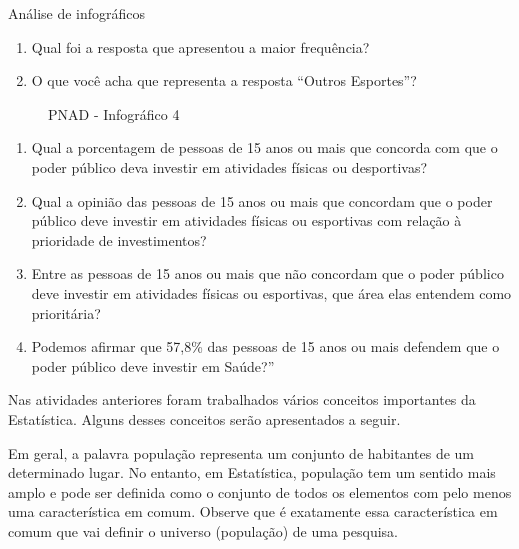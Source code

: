 \begin{task}{ Análise de infográficos}
\begin{enumerate}
\item {} 
Qual foi a resposta que apresentou a maior frequência?

\item {} 
O que você acha que representa a resposta ``Outros Esportes''?

\end{enumerate}

\begin{figure}[H]
\centering
\capstart

\noindent{}
\caption{PNAD - Infográfico 4}\label{\detokenize{PE103-0:fig-infografico-pnad-4}}\label{\detokenize{PE103-0:id4}}\end{figure}
\begin{enumerate}
\item {} 
Qual a porcentagem de pessoas de 15 anos ou mais que concorda com que o poder público deva investir em atividades físicas ou desportivas?

\item {} 
Qual a opinião das pessoas de 15 anos ou mais que concordam que o poder público deve investir em atividades físicas ou esportivas com relação à prioridade de investimentos?

\item {} 
Entre as pessoas de 15 anos ou mais que não concordam que o poder público deve investir em atividades físicas ou esportivas, que área elas entendem como prioritária?

\item {} 
Podemos afirmar que 57,8\% das pessoas de 15 anos ou mais defendem que o poder público deve investir em Saúde?''

\end{enumerate}
\end{task}


\arrange{ }
\label{\detokenize{PE103-1:organizando-as-ideias}}\label{\detokenize{PE103-1::doc}}
Nas atividades anteriores foram trabalhados vários conceitos importantes da Estatística. Alguns desses conceitos serão apresentados a seguir.
\label{\detokenize{PE103-1:sub-conceitos-basicos}}

Em geral, a palavra população representa um conjunto de habitantes de um determinado lugar. No entanto, em Estatística, população tem um sentido mais amplo e pode ser definida como o conjunto de todos os elementos com pelo menos uma característica em comum. Observe que é exatamente essa característica em comum que vai definir o universo (população) de uma pesquisa.

